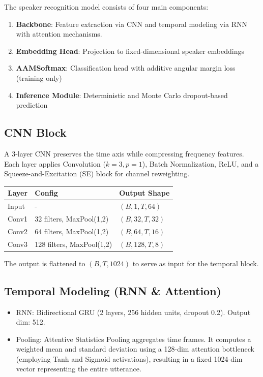 \documentclass[12pt,a4paper]{article}
\begin{document}
The speaker recognition model consists of four main components:

\begin{enumerate}
    \item \textbf{Backbone}: Feature extraction via CNN and temporal modeling via RNN with attention mechanisms.
    \item \textbf{Embedding Head}: Projection to fixed-dimensional speaker embeddings
    \item \textbf{AAMSoftmax}: Classification head with additive angular margin loss (training only)
    \item \textbf{Inference Module}: Deterministic and Monte Carlo dropout-based prediction
\end{enumerate}


\subsection{CNN Block}
A 3-layer CNN preserves the time axis while compressing frequency features.
Each layer applies Convolution ($k=3, p=1$), Batch Normalization, ReLU, and a Squeeze-and-Excitation (SE) block for channel reweighting.

\begin{table}[h]
\centering
\begin{tabular}{l|l|l}
\textbf{Layer} & \textbf{Config} & \textbf{Output Shape} \\ \hline
Input & - & $(B, 1, T, 64)$ \\
Conv1 & 32 filters, MaxPool(1,2) & $(B, 32, T, 32)$ \\
Conv2 & 64 filters, MaxPool(1,2) & $(B, 64, T, 16)$ \\
Conv3 & 128 filters, MaxPool(1,2) & $(B, 128, T, 8)$ \\
\end{tabular}
\end{table}

The output is flattened to $(B, T, 1024)$ to serve as input for the temporal block.

\subsection{Temporal Modeling (RNN \& Attention)}
\begin{itemize}
    \item RNN: Bidirectional GRU (2 layers, 256 hidden units, dropout 0.2). Output dim: 512.
    \item Pooling: Attentive Statistics Pooling aggregates time frames.
    It computes a weighted mean and standard deviation using a 128-dim attention bottleneck (employing Tanh and Sigmoid activations),
    resulting in a fixed 1024-dim vector representing the entire utterance.
\end{itemize}
\end{document}
